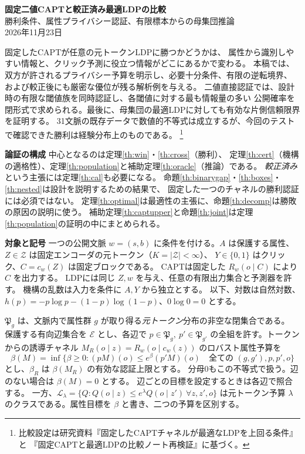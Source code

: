 \documentclass[a4paper,11pt]{ltjsarticle}
\theoremstyle{jp}
\newcommand{\cL}{\mathcal L}
\newcommand{\law}{\mathfrak P}
\newcommand{\cx}{\widehat C}
\newcommand{\para}[1]{\par\Needspace{3\baselineskip}\addvspace{.6\baselineskip}\noindent\textbf{#1}\enspace}
\begin{document}
\begin{center}
{\Large\bfseries 固定二値CAPTと較正済み最適LDPの比較}\\[4pt]
{\large 勝利条件、属性プライバシー認証、有限標本からの母集団推論}\\[7pt]
{\small 2026年11月23日}
\end{center}

\noindent
固定したCAPTが任意の元トークンLDPに勝つかどうかは、
属性から識別しやすい情報と、クリック予測に役立つ情報がどこにあるかで変わる。
本稿では、双方が許されるプライバシー予算を明示し、必要十分条件、有限の逆転境界、
および較正後にも厳密な優位が残る解析例を与える。
二値直接認証では、設計時の有限な閾値族を同時認証し、各閾値に対する最も情報量の多い
公開確率を閉形式で求められる。最後に、母集団の最適LDPに対しても有効な片側信頼限界を証明する。
31文脈の既存データで数値的不等式は成立するが、今回のテストで確認できた勝利は経験分布上のものである。%
\footnote{比較設定は研究資料『固定したCAPTチャネルが最適なLDPを上回る条件』と
『固定CAPTと最適LDPの比較ノート再検証』に基づく。}

\para{論証の構成}
中心となるのは定理\ref{th:win}・\ref{th:cross}（勝利）、
定理\ref{th:cert}（機構の適格性）、定理\ref{th:population}と補助定理\ref{th:oracle}（推論）である。
\emph{較正済み}という主張には定理\ref{th:cal}も必要になる。
命題\ref{th:binarygap}・\ref{th:boxes}・\ref{th:nested}は設計を説明するための結果で、
固定した一つのチャネルの勝利認証には必須ではない。
定理\ref{th:optimal}は最適性の主張に、命題\ref{th:decomp}は勝敗の原因の説明に使う。
補助定理\ref{th:captupper}と命題\ref{th:joint}は定理\ref{th:population}の証明の中にまとめられる。

\para{対象と記号}
一つの公開文脈 \(w=(s,b)\) に条件を付ける。\(A\) は保護する属性、
\(Z\in\mathcal Z\) は固定エンコーダの元トークン（\(K=|\mathcal Z|<\infty\)）、
\(Y\in\{0,1\}\) はクリック、\(C=c_w(Z)\) は固定ブロックである。
CAPTは固定した \(R_w(o\mid C)\) により \(\cx\) を出力する。
LDPには同じ \(Z,w\) を与え、任意の有限出力集合と予測器を許す。
機構の乱数は入力を条件に \(A,Y\) から独立とする。
以下、対数は自然対数、\(h(p)=-p\log p-(1-p)\log(1-p)\)、\(0\log0=0\) とする。

\(\law_g\) は、文脈内で属性群 \(g\) が取り得る\emph{元トークン}分布の非空な閉集合である。
保護する有向辺集合を \(\mathcal E\) とし、各辺で
\(p\in\law_g,\ p'\in\law_{g'}\) の全組を許す。トークンからの誘導チャネル
\(M_R(o\mid z)=R_w(o\mid c_w(z))\) のロバスト属性予算を
\[
 \beta(M)=\inf\{\beta\ge0:(pM)(o)\le e^\beta(p'M)(o)
 \quad\text{全ての }(g,g'),p,p',o\}
\]
とし、\(\beta_R\) は \(\beta(M_R)\) の有効な認証上限とする。
分母0もこの不等式で扱う。辺のない場合は \(\beta(M)=0\) とする。
辺ごとの目標を設定するときは各辺で照合する。
一方、\(\cL_\lambda=\{Q:Q(o\mid z)\le e^\lambda Q(o\mid z')\ \forall z,z',o\}\)
は元トークン予算 \(\lambda\) のクラスである。属性目標を \(\beta\) と書き、二つの予算を区別する。
\end{document}
